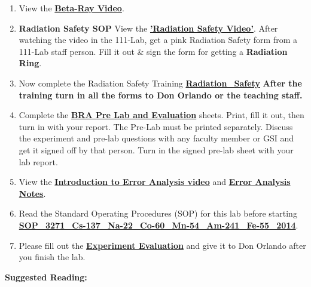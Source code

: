 \documentclass{../lab}
\begin{document}
\begin{enumerate}
    \item View the \href{http://youtu.be/qJ4MPtMmFPw}{\textbf{Beta-Ray Video}}.

    \item \textbf{Radiation Safety SOP} View the \href{http://youtu.be/KHxtzF5pZZM}{\textbf{'Radiation Safety Video'}}. After watching the video in the 111-Lab, get a pink Radiation Safety form from a 111-Lab staff person. Fill it out \& sign the form for getting a \textbf{Radiation Ring}.

    \item Now complete the Radiation Safety Training \href{http://experimentationlab.berkeley.edu/RadiationSafety}{\textbf{Radiation\_Safety}} \textbf{After the training turn in all the forms to Don Orlando or the teaching staff.}

    \item Complete the \href{http://experimentationlab.berkeley.edu/BRAPreLab}{\textbf{BRA Pre Lab and Evaluation}} sheets. Print, fill it out, then turn in with your report. The Pre-Lab must be printed separately. Discuss the experiment and pre-lab questions with any faculty member or GSI and get it signed off by that person. Turn in the signed pre-lab sheet with your lab report.

    \item View the \href{\ErrorAnalysisVideo}{\textbf{Introduction to Error Analysis video}} and \href{\ErrorAnalysisNotes}{\textbf{\textbf{Error Analysis Notes}}}.

    \item Read the Standard Operating Procedures (SOP) for this lab before starting \href{http://experimentationlab.berkeley.edu/sites/default/files/images/SOP\_3271\_Cs-137\_Na-22\_Co-60\_Mn-54\_Am-241\_Fe-55\_2014.pdf}{\textbf{SOP\_3271\_Cs-137\_Na-22\_Co-60\_Mn-54\_Am-241\_Fe-55\_2014}}.

    \item Please fill out the \href{\ExperimentEvaluation}{\textbf{Experiment Evaluation}} and give it to Don Orlando after you finish the lab.

\end{enumerate}

\textbf{Suggested Reading:}
\end{document}
